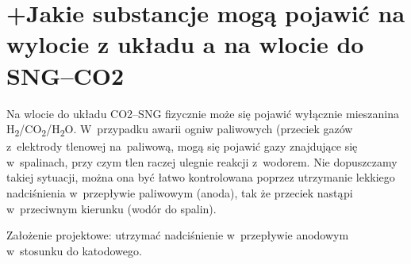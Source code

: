 \section{+Jakie substancje mogą pojawić na wylocie z układu a na wlocie do
SNG–CO2}

Na wlocie do układu CO2–SNG fizycznie może się pojawić wyłącznie mieszanina
H\textsubscript{2}/CO\textsubscript{2}/H\textsubscript{2}O. W~przypadku
awarii ogniw paliwowych (przeciek gazów z~elektrody tlenowej na~paliwową,
mogą się pojawić gazy znajdujące się w~spalinach, przy czym tlen
raczej ulegnie reakcji z~wodorem. Nie dopuszczamy takiej sytuacji,
można ona być łatwo kontrolowana poprzez utrzymanie lekkiego nadciśnienia
w~przepływie paliwowym (anoda), tak że przeciek nastąpi w~przeciwnym
kierunku (wodór do spalin).

Założenie projektowe: utrzymać nadciśnienie w~przepływie anodowym
w~stosunku do katodowego.